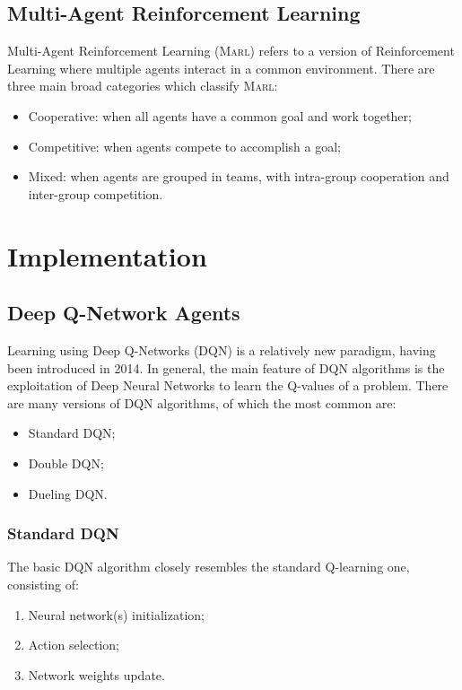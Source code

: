 \documentclass[a4paper, 12pt]{article}
\numberwithin{equation}{section}
\begin{document}
\subsection[Multi-Agent Reinforcement Learning]{Multi-Agent Reinforcement Learning \cite{multi-agent-rl}}

Multi-Agent Reinforcement Learning (\textsc{Marl}) refers to a version of Reinforcement Learning where multiple agents interact in a common environment. There are three main broad categories which classify \textsc{Marl}:
\begin{itemize}
	\item Cooperative: when all agents have a common goal and work together;
	\item Competitive: when agents compete to accomplish a goal;
	\item Mixed: when agents are grouped in teams, with intra-group cooperation and inter-group competition.
\end{itemize}


\clearpage
\section{Implementation}



\subsection[Deep Q-Network Agents]{Deep Q-Network Agents \cite{dqn-tutorial, improvements, drl-8-dqn-ddqn}}\label{sec:dqns}

Learning using Deep Q-Networks (DQN) is a relatively new paradigm, having been introduced in 2014. In general, the main feature of DQN algorithms is the exploitation of Deep Neural Networks to learn the Q-values of a problem. There are many versions of DQN algorithms, of which the most common are:
\begin{itemize}
	\item Standard DQN;
	\item Double DQN;
	\item Dueling DQN.
\end{itemize}


\subsubsection{Standard DQN}

The basic DQN algorithm closely resembles the standard Q-learning one, consisting of:
\begin{enumerate}
	\item Neural network(s) initialization;
	\item Action selection;
	\item Network weights update.
\end{enumerate}
\end{document}
